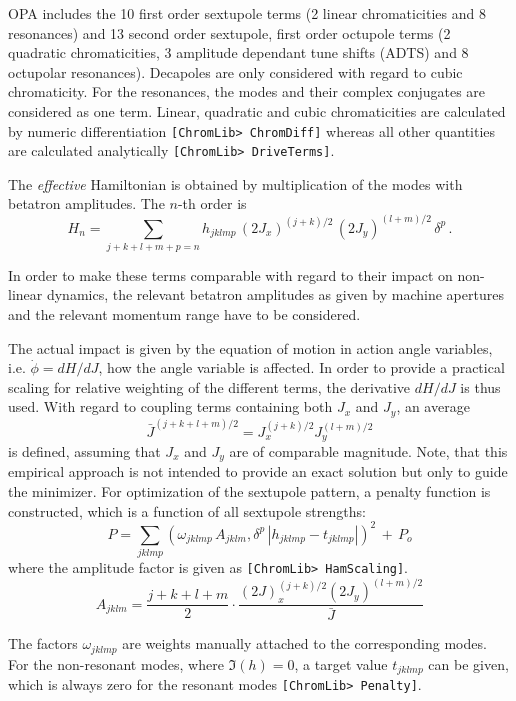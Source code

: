 \documentclass[12pt]{article}
\newcommand\beq{\begin{equation}}
\newcommand\eeq{\end{equation}}
\newcommand\code[1]{{\tt [#1]}}
\begin{document}
OPA includes the 10 first order sextupole terms (2 linear  chromaticities
and 8 resonances) and 13 second order sextupole, first order octupole terms (2 quadratic chromaticities, 3 amplitude dependant tune shifts (ADTS) and 8 octupolar resonances). Decapoles are only considered with regard to cubic chromaticity. For the resonances, the modes and their complex conjugates are considered as one term.
Linear, quadratic and cubic chromaticities are calculated by numeric differentiation \code{ChromLib> ChromDiff} whereas all other quantities are calculated analytically \code{ChromLib> DriveTerms}.

The {\em effective} Hamiltonian is obtained by multiplication of the modes with betatron amplitudes. The $n$-th order is
\[
H_n = \sum_{j+k+l+m+p=n} h_{jklmp}\, (2J_x)^{(j+k)/2} \,(2J_y)^{(l+m)/2}\, \delta^p\, .
\]

In order to make these terms comparable with regard to their impact on non-linear dynamics, the relevant betatron amplitudes as given by machine apertures and the relevant momentum range have to be considered.

The actual impact is given by the equation of motion in action angle variables, i.e. 
$\dot\phi=dH/dJ$, how the angle variable is affected. In order to provide a practical scaling for relative weighting of the different terms, the derivative $dH/dJ$ is thus used. 
With regard to coupling terms containing both $J_x$ and $J_y$, an average 
\[
\bar J^{(j+k+l+m)/2} = J_x^{(j+k)/2} J_y^{(l+m)/2}
\]
is defined, assuming that $J_x$ and $J_y$ are of comparable magnitude.
Note, that this empirical approach is not intended to provide an exact solution but only to guide the minimizer.
For optimization of the sextupole pattern, a penalty function is constructed, which is a function of all sextupole strengths:
\beq\label{eqpenal}
P = \sum_{jklmp} \left( \omega_{jklmp} \, A_{jklm}, \delta^p \, |h_{jklmp}   -t_{jklmp}| \right)^2\, + \, P_o
\eeq
where the amplitude factor is given as \code{ChromLib> HamScaling}.
\[
A_{jklm}= \frac{j+k+l+m}{2}\cdot \frac{ (2J)_x^{(j+k)/2} (2J_y)^{(l+m)/2}}{\bar J}
\]

The factors $\omega_{jklmp}$ are weights manually attached to the corresponding modes.
For the non-resonant modes, where $\Im (h)=0$, a target value
$t_{jklmp}$ can be given, which is always zero for the resonant modes \code{ChromLib> Penalty}.
\end{document}
